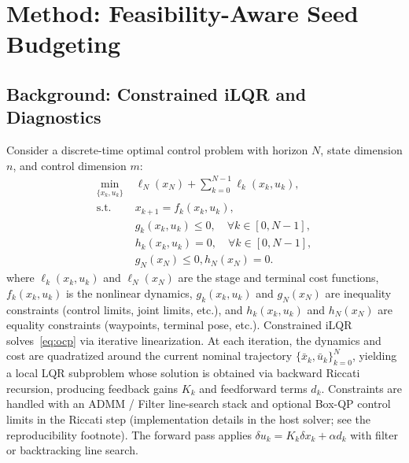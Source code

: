 \documentclass[lettersize,journal]{IEEEtran}
\begin{document}
\section{Method: Feasibility-Aware Seed Budgeting}

\subsection{Background: Constrained iLQR and Diagnostics}
\label{sec:chi_background}

Consider a discrete-time optimal control problem with horizon $N$, state dimension $n$, and control dimension $m$:
\begin{equation}
\label{eq:ocp}
\begin{aligned}
\min_{\{x_k, u_k\}} \; & \ell_N(x_N) + \sum_{k=0}^{N-1} \ell_k(x_k, u_k),\\
\text{s.t.}\quad & x_{k+1} = f_k(x_k, u_k), \\
                  & g_k(x_k, u_k) \leq 0, \quad \forall k \in [0, N-1],\\
                  & h_k(x_k, u_k) = 0, \quad \forall k \in [0, N-1], \\
                  & g_N(x_N) \leq 0, h_N(x_N) = 0.
\end{aligned}
\end{equation}
where $\ell_k(x_k, u_k)$ and $\ell_N(x_N)$ are the stage and terminal cost functions, $f_k(x_k, u_k)$ is the nonlinear dynamics, $g_k(x_k, u_k)$ and $g_N(x_N)$ are inequality constraints (control limits, joint limits, etc.), and $h_k(x_k, u_k)$ and $h_N(x_N)$ are equality constraints (waypoints, terminal pose, etc.). Constrained iLQR solves~\eqref{eq:ocp} via iterative linearization. At each iteration, the dynamics and cost are quadratized around the current nominal trajectory $\{\bar{x}_k, \bar{u}_k\}_{k=0}^N$, yielding a local LQR subproblem whose solution is obtained via backward Riccati recursion, producing feedback gains $K_k$ and feedforward terms $d_k$. Constraints are handled with an ADMM / Filter line-search stack and optional Box-QP control limits in the Riccati step (implementation details in the host solver; see the reproducibility footnote). The forward pass applies $\delta u_k = K_k \delta x_k + \alpha d_k$ with filter or backtracking line search.
\end{document}
